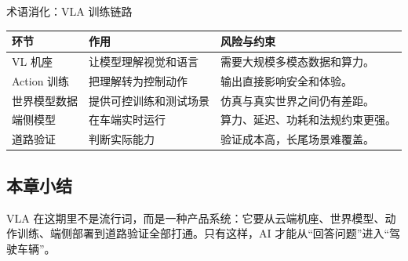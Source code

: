 \begin{knowledgebox}{术语消化：VLA 训练链路}
\begin{tabularx}{\textwidth}{p{}p{}X}
\toprule
环节 & 作用 & 风险与约束 \\
\midrule
VL 机座 & 让模型理解视觉和语言 & 需要大规模多模态数据和算力。 \\
Action 训练 & 把理解转为控制动作 & 输出直接影响安全和体验。 \\
世界模型数据 & 提供可控训练和测试场景 & 仿真与真实世界之间仍有差距。 \\
端侧模型 & 在车端实时运行 & 算力、延迟、功耗和法规约束更强。 \\
道路验证 & 判断实际能力 & 验证成本高，长尾场景难覆盖。 \\
\bottomrule
\end{tabularx}
\end{knowledgebox}

\subsection{本章小结}

VLA 在这期里不是流行词，而是一种产品系统：它要从云端机座、世界模型、动作训练、端侧部署到道路验证全部打通。只有这样，AI 才能从“回答问题”进入“驾驶车辆”。

